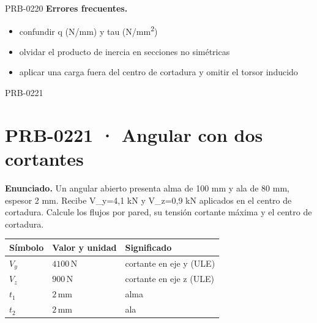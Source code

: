 \begin{studiumworked}{PRB-0220}
\textbf{Errores frecuentes.}\begin{itemize}\item confundir q (N/mm) y tau (N/mm\textsuperscript{2})
\item olvidar el producto de inercia en secciones no simétricas
\item aplicar una carga fuera del centro de cortadura y omitir el torsor inducido\end{itemize}

\end{studiumworked}

\Needspace{.3\textheight}

\begin{studiumworked}{PRB-0221}

\section{PRB-0221 · Angular con dos cortantes}

\textbf{Enunciado.} Un angular abierto presenta alma de 100 mm y ala de 80 mm, espesor 2 mm. Recibe V\_y=4,1 kN y V\_z=0,9 kN aplicados en el centro de cortadura. Calcule los flujos por pared, su tensión cortante máxima y el centro de cortadura.

\par\medskip\noindent\begin{tabular}{@{}p{.18\linewidth}p{.26\linewidth}p{.48\linewidth}@{}}
\toprule Símbolo & Valor y unidad & Significado\\\midrule
$V_{y}$ & $4100\,\mathrm{N}$ & cortante en eje y (ULE)\\
$V_{z}$ & $900\,\mathrm{N}$ & cortante en eje z (ULE)\\
$t_{1}$ & $2\,\mathrm{mm}$ & alma\\
$t_{2}$ & $2\,\mathrm{mm}$ & ala\\
\bottomrule\end{tabular}\par\medskip


\end{studiumworked}
